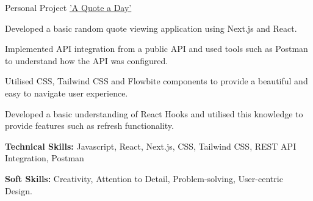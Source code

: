 \begin{cventries}
  \cventry
    {Personal Project}
    {\href{https://github.com/NDR-114/a-quote-a-day}{'A Quote a Day'}}%
    {} %
    {} %
    {
      \begin{cvitems} %
        \item {Developed a basic random quote viewing application using Next.js and React.}
        \item {Implemented API integration from a public API and used tools such as Postman to understand how
the API was configured.}
        \item {Utilised CSS, Tailwind CSS and Flowbite components to provide a beautiful and easy to navigate
user experience.}
        \item {Developed a basic understanding of React Hooks and utilised this knowledge to provide features
such as refresh functionality.}
        \item {\textbf{Technical Skills:} Javascript, React, Next.js, CSS, Tailwind CSS, REST API Integration, Postman}
        \item {\textbf{Soft Skills:} Creativity, Attention to Detail, Problem-solving, User-centric Design.}
      \end{cvitems}
    }

\end{cventries}
